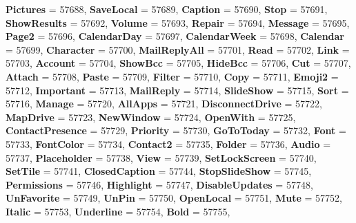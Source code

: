 \begin{DoxyCompactItemize}
{\bfseries Pictures} = 57688, 
{\bfseries Save\+Local} = 57689, 
{\bfseries Caption} = 57690, 
\newline
{\bfseries Stop} = 57691, 
{\bfseries Show\+Results} = 57692, 
{\bfseries Volume} = 57693, 
{\bfseries Repair} = 57694, 
\newline
{\bfseries Message} = 57695, 
{\bfseries Page2} = 57696, 
{\bfseries Calendar\+Day} = 57697, 
{\bfseries Calendar\+Week} = 57698, 
\newline
{\bfseries Calendar} = 57699, 
{\bfseries Character} = 57700, 
{\bfseries Mail\+Reply\+All} = 57701, 
{\bfseries Read} = 57702, 
\newline
{\bfseries Link} = 57703, 
{\bfseries Account} = 57704, 
{\bfseries Show\+Bcc} = 57705, 
{\bfseries Hide\+Bcc} = 57706, 
\newline
{\bfseries Cut} = 57707, 
{\bfseries Attach} = 57708, 
{\bfseries Paste} = 57709, 
{\bfseries Filter} = 57710, 
\newline
{\bfseries Copy} = 57711, 
{\bfseries Emoji2} = 57712, 
{\bfseries Important} = 57713, 
{\bfseries Mail\+Reply} = 57714, 
\newline
{\bfseries Slide\+Show} = 57715, 
{\bfseries Sort} = 57716, 
{\bfseries Manage} = 57720, 
{\bfseries All\+Apps} = 57721, 
\newline
{\bfseries Disconnect\+Drive} = 57722, 
{\bfseries Map\+Drive} = 57723, 
{\bfseries New\+Window} = 57724, 
{\bfseries Open\+With} = 57725, 
\newline
{\bfseries Contact\+Presence} = 57729, 
{\bfseries Priority} = 57730, 
{\bfseries Go\+To\+Today} = 57732, 
{\bfseries Font} = 57733, 
\newline
{\bfseries Font\+Color} = 57734, 
{\bfseries Contact2} = 57735, 
{\bfseries Folder} = 57736, 
{\bfseries Audio} = 57737, 
\newline
{\bfseries Placeholder} = 57738, 
{\bfseries View} = 57739, 
{\bfseries Set\+Lock\+Screen} = 57740, 
{\bfseries Set\+Tile} = 57741, 
\newline
{\bfseries Closed\+Caption} = 57744, 
{\bfseries Stop\+Slide\+Show} = 57745, 
{\bfseries Permissions} = 57746, 
{\bfseries Highlight} = 57747, 
\newline
{\bfseries Disable\+Updates} = 57748, 
{\bfseries Un\+Favorite} = 57749, 
{\bfseries Un\+Pin} = 57750, 
{\bfseries Open\+Local} = 57751, 
\newline
{\bfseries Mute} = 57752, 
{\bfseries Italic} = 57753, 
{\bfseries Underline} = 57754, 
{\bfseries Bold} = 57755, 
\newline

\end{DoxyCompactItemize}
